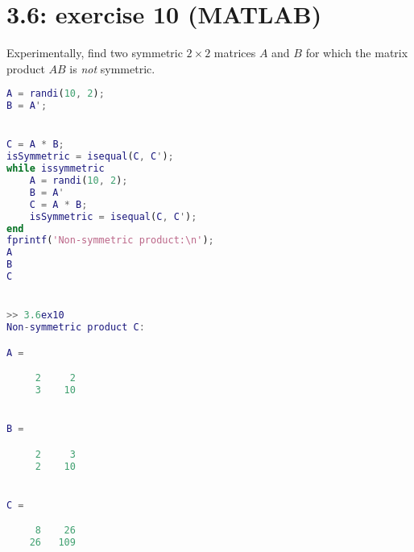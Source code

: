 \documentclass{report}
\begin{document}
\section*{3.6: exercise 10 (MATLAB)} 

Experimentally, find two symmetric $2\times 2$ matrices $A$ and $B$ for
which the matrix product $AB$ is {\em not\/} symmetric.


\sol 






\begin{lstlisting}[language=Matlab, caption={MATLAB code}, xleftmargin=\parindent]
A = randi(10, 2);
B = A';


C = A * B;
isSymmetric = isequal(C, C');
while issymmetric
    A = randi(10, 2);
    B = A'
    C = A * B;
    isSymmetric = isequal(C, C');
end
fprintf('Non-symmetric product:\n');
A
B
C


>> 3.6ex10
Non-symmetric product C:

A =

     2     2
     3    10


B =

     2     3
     2    10


C =

     8    26
    26   109





\end{lstlisting}
\end{document}
